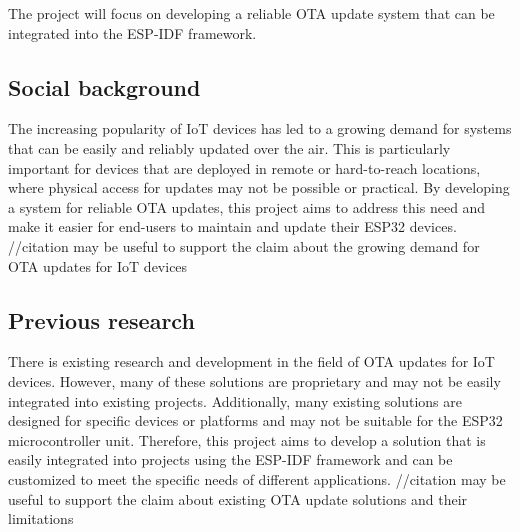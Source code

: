 The project will focus on developing a reliable OTA update system that can be integrated into the ESP-IDF framework.

\subsection{Social background}
\label{sec:social}
The increasing popularity of IoT devices has led to a growing demand for systems that can be easily and reliably updated over the air. This is particularly important for devices that are deployed in remote or hard-to-reach locations, where physical access for updates may not be possible or practical. By developing a system for reliable OTA updates, this project aims to address this need and make it easier for end-users to maintain and update their ESP32 devices. //citation may be useful to support the claim about the growing demand for OTA updates for IoT devices

\subsection{Previous research}
\label{sec:previous}
There is existing research and development in the field of OTA updates for IoT devices. However, many of these solutions are proprietary and may not be easily integrated into existing projects. Additionally, many existing solutions are designed for specific devices or platforms and may not be suitable for the ESP32 microcontroller unit. Therefore, this project aims to develop a solution that is easily integrated into projects using the ESP-IDF framework and can be customized to meet the specific needs of different applications. //citation may be useful to support the claim about existing OTA update solutions and their limitations